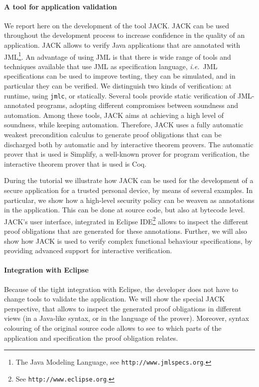 \documentclass[]{llncs}
\begin{document}
\paragraph{A tool for application validation}
We report here on the development of the tool JACK. JACK can be used
throughout the development process to increase confidence in the
quality of an application. JACK allows to verify Java applications
that are annotated with JML\footnote{The Java Modeling Language, see
\texttt{http://www.jmlspecs.org}.}. An advantage of using JML is that
there is wide range of tools and techniques available that use JML as
specification language, \emph{i.e.}\ JML specifications can be used to
improve testing, they can be simulated, and in particular they can be
verified. We distinguish two kinds of verification: at runtime, using
\texttt{jmlc}, or statically. Several tools provide
static verification of JML-annotated programs, adopting different
compromises between soundness and automation.  Among these tools, JACK
aims at achieving a high level of soundness, while keeping
automation. Therefore, JACK uses a fully automatic weakest
precondition calculus to generate proof obligations that can be
discharged both by automatic and by interactive theorem provers. The
automatic prover that is used is Simplify, a well-known prover for
program verification, the interactive theorem prover that is used is
Coq.

During the tutorial we illustrate how JACK can be used for the
development of a secure application for a trusted personal device, by
means of several examples. In particular, we show how a high-level
security policy can be weaven as annotations in the application. This
can be done at source code, but also at bytecode level. JACK's user
interface, integrated in Eclipse IDE\footnote{See
\texttt{http://www.eclipse.org}.} allows to inspect the different
proof obligations that are generated for these annotations. Further,
we will also show how JACK is used to verify complex functional
behaviour specifications, by providing advanced support for
interactive verification.


\paragraph{Integration with Eclipse}
Because of the tight integration with Eclipse, the developer does not
have to change tools to validate the application. We will show the
special JACK perspective, that allows to inspect the generated proof
obligations in different views (in a Java-like syntax, or in the
language of the prover). Moreover, syntax colouring of the original
source code allows to see to which parts of the application and
specification the proof obligation relates.
\end{document}
